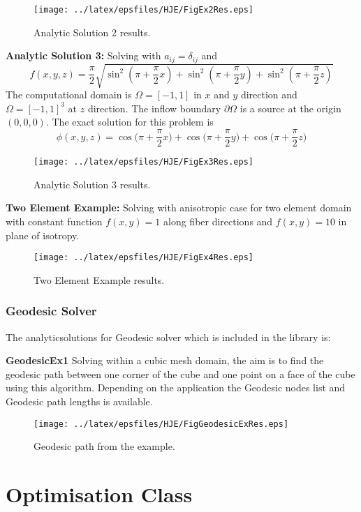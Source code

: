 \begin{figure}[h]
  \centering
    \texttt{[image: ../latex/epsfiles/HJE/FigEx2Res.eps]}
  \caption{Analytic Solution 2 results.}
  \label{fig:Ex2}
\end{figure}


\textbf{Analytic Solution 3:} Solving with $a_{ij}=\delta_{ij}$ and $$f(x,y,z)=\frac{\pi}{2} \sqrt{\sin^2{(\pi + \frac{\pi}{2}x)}+\sin^2{(\pi + \frac{\pi}{2}y)}+\sin^2{(\pi + \frac{\pi}{2}z)}}$$ The computational domain is $\Omega=[-1,1]$ in $x$ and $y$ direction and $\Omega=[-1,1]^3$ at $z$ direction. The inflow boundary $\partial\Omega$ is a source at the origin $(0,0,0)$. The exact solution for this problem is $$\phi(x,y,z)=\cos{(\pi + \frac{\pi}{2}x})+\cos{(\pi + \frac{\pi}{2}y})+\cos{(\pi + \frac{\pi}{2}z})$$

\begin{figure}[h]
  \centering
    \texttt{[image: ../latex/epsfiles/HJE/FigEx3Res.eps]}
  \caption{Analytic Solution 3 results.}
  \label{fig:Ex3}
\end{figure}


\textbf{Two Element Example:} Solving with anisotropic case for two element domain with constant function $f(x,y)=1$ along fiber directions and $f(x,y)=10$ in plane of isotropy.

\begin{figure}[h]
  \centering
    \texttt{[image: ../latex/epsfiles/HJE/FigEx4Res.eps]}
  \caption{Two Element Example results.}
  \label{fig:Ex4}
\end{figure}


\subsubsection{Geodesic Solver}

\noindent The analyticsolutions for Geodesic solver which is included in the library is:

\textbf{GeodesicEx1} Solving within a cubic mesh domain, the aim is to find the geodesic path between one corner of the cube and one point on a face of the cube using this algorithm.
Depending on the application the Geodesic nodes list and Geodesic path lengths is available.

\begin{figure}[h]
  \centering
    \texttt{[image: ../latex/epsfiles/HJE/FigGeodesicExRes.eps]}
  \caption{Geodesic path from the example.}
  \label{fig:GeodesicEx}
\end{figure}

\section{Optimisation Class}
\clearpage
